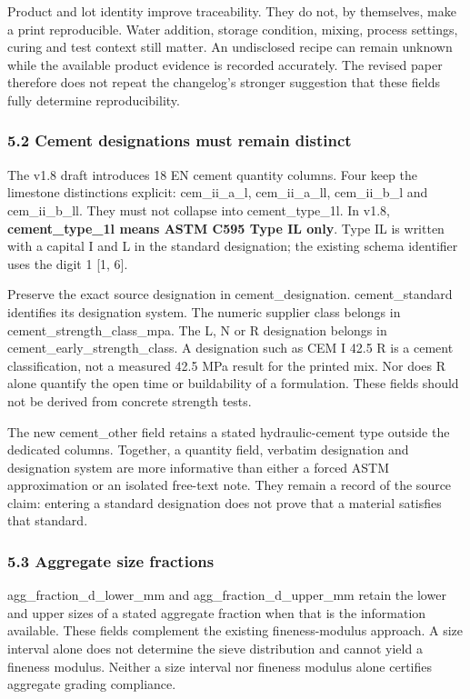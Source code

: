 \documentclass[
  american,
  11pt,
  letterpaper,
]{article}
\renewcommand{\texttt}[1]{{\ttfamily\fontsize{9.5}{11}\selectfont\hyphenchar\font=-1 #1}}
\begin{document}
Product and lot identity improve traceability. They do not, by
themselves, make a print reproducible. Water addition, storage
condition, mixing, process settings, curing and test context still
matter. An undisclosed recipe can remain unknown while the available
product evidence is recorded accurately. The revised paper therefore
does not repeat the changelog's stronger suggestion that these fields
fully determine reproducibility.

\subsubsection{5.2 Cement designations must remain
distinct}\label{cement-designations-must-remain-distinct}

The v1.8 draft introduces 18 EN cement quantity columns. Four keep the
limestone distinctions explicit: \texttt{cem\_ii\_a\_l},
\texttt{cem\_ii\_a\_ll}, \texttt{cem\_ii\_b\_l} and
\texttt{cem\_ii\_b\_ll}. They must not collapse into
\texttt{cement\_type\_1l}. In v1.8, \textbf{\texttt{cement\_type\_1l}
means ASTM C595 Type IL only}. Type IL is written with a capital I and L
in the standard designation; the existing schema identifier uses the
digit 1 {[}1, 6{]}.

Preserve the exact source designation in \texttt{cement\_designation}.
\texttt{cement\_standard} identifies its designation system. The numeric
supplier class belongs in \texttt{cement\_strength\_class\_mpa}. The L,
N or R designation belongs in \texttt{cement\_early\_strength\_class}. A
designation such as CEM I 42.5 R is a cement classification, not a
measured 42.5 MPa result for the printed mix. Nor does R alone quantify
the open time or buildability of a formulation. These fields should not
be derived from concrete strength tests.

The new \texttt{cement\_other} field retains a stated hydraulic-cement
type outside the dedicated columns. Together, a quantity field, verbatim
designation and designation system are more informative than either a
forced ASTM approximation or an isolated free-text note. They remain a
record of the source claim: entering a standard designation does not
prove that a material satisfies that standard.

\subsubsection{5.3 Aggregate size
fractions}\label{aggregate-size-fractions}

\texttt{agg\_fraction\_d\_lower\_mm} and
\texttt{agg\_fraction\_d\_upper\_mm} retain the lower and upper sizes of
a stated aggregate fraction when that is the information available.
These fields complement the existing fineness-modulus approach. A size
interval alone does not determine the sieve distribution and cannot
yield a fineness modulus. Neither a size interval nor fineness modulus
alone certifies aggregate grading compliance.
\end{document}
